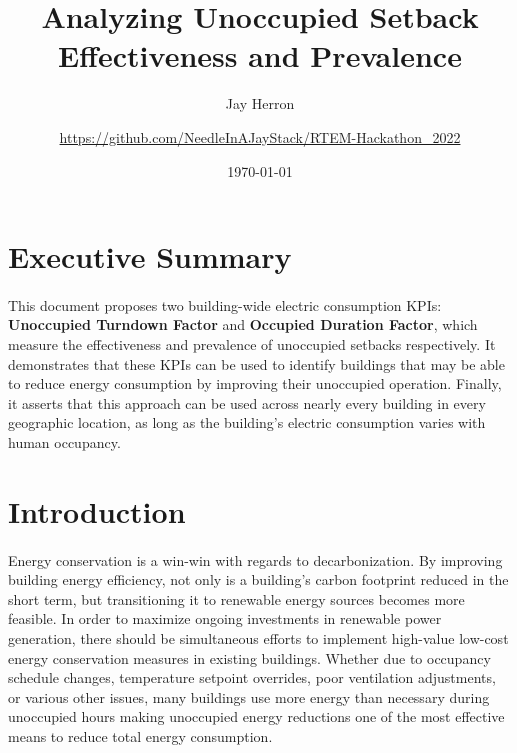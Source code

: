 \documentclass[a4paper]{article}
\begin{document}
\begin{titlepage}
\title{Analyzing Unoccupied Setback Effectiveness and Prevalence}
\author{
	Jay Herron
	\and
	\url{https://github.com/NeedleInAJayStack/RTEM-Hackathon\_2022}
}
\date{\today}
\maketitle
\end{titlepage}

\section*{Executive Summary}

\paragraph{}
This document proposes two building-wide electric consumption KPIs: \textbf{Unoccupied Turndown Factor} and \textbf{Occupied Duration Factor}, which measure the effectiveness and prevalence of unoccupied setbacks respectively. It demonstrates that these KPIs can be used to identify buildings that may be able to reduce energy consumption by improving their unoccupied operation.  Finally, it asserts that this approach can be used across nearly every building in every geographic location, as long as the building's electric consumption varies with human occupancy.

\pagebreak

\section{Introduction}

\paragraph{}
Energy conservation is a win-win with regards to decarbonization. By improving building energy efficiency, not only is a building's carbon footprint reduced in the short term, but transitioning it to renewable energy sources becomes more feasible. In order to maximize ongoing investments in renewable power generation, there should be simultaneous efforts to implement high-value low-cost energy conservation measures in existing buildings. Whether due to occupancy schedule changes, temperature setpoint overrides, poor ventilation adjustments, or various other issues, many buildings use more energy than necessary during unoccupied hours making unoccupied energy reductions one of the most effective means to reduce total energy consumption.
\end{document}

